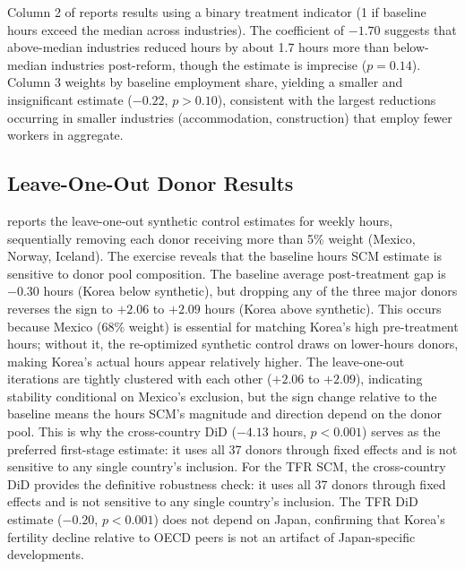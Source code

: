 \documentclass[12pt]{article}
\begin{document}
Column 2 of  reports results using a binary treatment indicator (1 if baseline hours exceed the median across industries). The coefficient of $-1.70$ suggests that above-median industries reduced hours by about 1.7 hours more than below-median industries post-reform, though the estimate is imprecise ($p = 0.14$). Column 3 weights by baseline employment share, yielding a smaller and insignificant estimate ($-0.22$, $p > 0.10$), consistent with the largest reductions occurring in smaller industries (accommodation, construction) that employ fewer workers in aggregate.

\subsection{Leave-One-Out Donor Results}

 reports the leave-one-out synthetic control estimates for weekly hours, sequentially removing each donor receiving more than 5\% weight (Mexico, Norway, Iceland). The exercise reveals that the baseline hours SCM estimate is sensitive to donor pool composition. The baseline average post-treatment gap is $-0.30$ hours (Korea below synthetic), but dropping any of the three major donors reverses the sign to $+2.06$ to $+2.09$ hours (Korea above synthetic). This occurs because Mexico (68\% weight) is essential for matching Korea's high pre-treatment hours; without it, the re-optimized synthetic control draws on lower-hours donors, making Korea's actual hours appear relatively higher. The leave-one-out iterations are tightly clustered with each other ($+2.06$ to $+2.09$), indicating stability conditional on Mexico's exclusion, but the sign change relative to the baseline means the hours SCM's magnitude and direction depend on the donor pool. This is why the cross-country DiD ($-4.13$ hours, $p < 0.001$) serves as the preferred first-stage estimate: it uses all 37 donors through fixed effects and is not sensitive to any single country's inclusion. For the TFR SCM, the cross-country DiD provides the definitive robustness check: it uses all 37 donors through fixed effects and is not sensitive to any single country's inclusion. The TFR DiD estimate ($-0.20$, $p < 0.001$) does not depend on Japan, confirming that Korea's fertility decline relative to OECD peers is not an artifact of Japan-specific developments.
\end{document}
